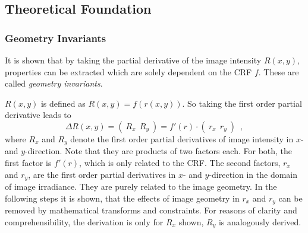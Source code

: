 \subsection{Theoretical Foundation}
\label{subsec:geoinvtheory}

\subsubsection{Geometry Invariants}
\label{subsubsec:geoinv}
It is shown that by taking the partial derivative of the image intensity $R(x,y)$, properties can be extracted which are solely dependent on the CRF $f$. These are called \emph{geometry invariants}. 

$R(x,y)$ is defined as $R(x,y) = f(r(x,y))$. So taking the first order partial derivative leads to
\begin{equation}
	\Delta R(x,y) = (\ R_x \ \ R_y\ ) = f'(r) \cdot (\ r_x \ \ r_y\ ) \enspace ,
	\label{eq:1storderpartderiv}
\end{equation}
where $R_x$ and $R_y$ denote the first order partial derivatives of image intensity in $x$- and $y$-direction. Note that they are products of two factors each. For both, the first factor is $f'(r)$, which is only related to the CRF. The second factors, $r_x$ and $r_y$, are the first order partial derivatives in $x$- and $y$-direction in the domain of image irradiance. They are purely related to the image geometry. In the following steps it is shown, that the effects of image geometry in $r_x$ and $r_y$ can be removed by mathematical transforms and constraints. For reasons of clarity and comprehensibility, the derivation is only for $R_x$ shown, $R_y$ is analogously derived.

